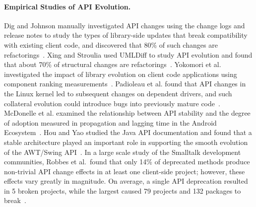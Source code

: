 \paragraph{{Empirical Studies of API Evolution.}}
Dig and Johnson manually investigated API changes using the change logs and release notes to study the types of library-side updates that break compatibility with existing client code, and discovered that 80\% of such changes are refactorings~\cite{Dig2005}. Xing and Stroulia used UMLDiff to study API evolution and found that about 70\% of structural changes are refactorings~\cite{Xing2006:apievol}. Yokomori et al. investigated the impact of library evolution on client code applications using component ranking measurements~\cite{Yokomori2009:apiimpact}. Padioleau et al. found that API changes in the Linux kernel led to subsequent changes on dependent drivers, and such collateral evolution could introduce bugs into previously mature code~\cite{Padioleau2006:collateral}. McDonelle et al. examined the relationship between API stability and the degree of adoption measured in propagation and lagging time in the Android Ecosystem~\cite{McDonnell2013:api}. Hou and Yao studied the Java API documentation and found that a stable architecture played an important role in supporting the smooth evolution of the AWT/Swing API~\cite{Hou2011:api}. In a large scale study of the Smalltalk development communities, Robbes et al.~found that only 14\% of deprecated methods produce non-trivial API change effects in at least one client-side project; however, these effects vary greatly in magnitude. On average, a single API deprecation resulted in 5 broken projects, while the largest caused 79 projects and 132 packages to break~\cite{robbes2012}.

